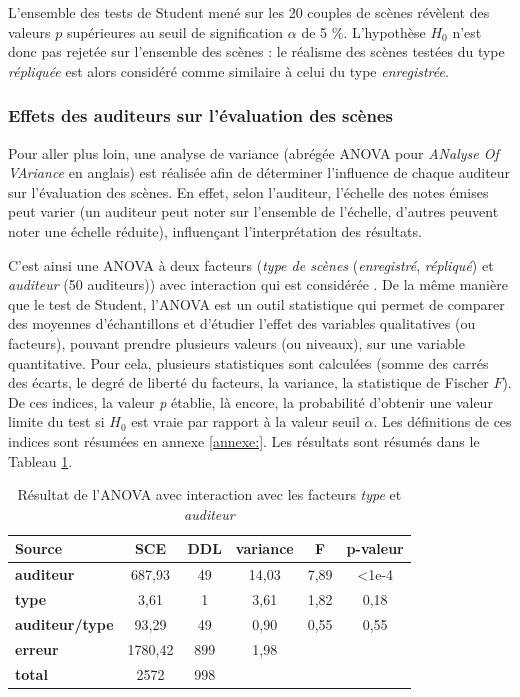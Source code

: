 L'ensemble des tests de Student mené sur les 20 couples de scènes révèlent des valeurs $p$ supérieures au seuil de signification $\alpha$ de 5 $\%$. L'hypothèse $H_0$ n'est donc pas rejetée sur l'ensemble des scènes : le réalisme des scènes testées du type \textit{répliquée} est alors considéré comme similaire à celui du type \textit{enregistrée}.


\subsubsection{Effets des auditeurs sur l'évaluation des scènes}

Pour aller plus loin, une analyse de variance (abrégée ANOVA pour \textit{ANalyse Of VAriance} en anglais) est réalisée afin de déterminer l'influence de chaque auditeur sur l'évaluation des scènes. En effet, selon l'auditeur, l'échelle des notes émises peut varier (un auditeur peut noter sur l'ensemble de l'échelle, d'autres peuvent noter une échelle réduite), influençant l'interprétation des résultats.

C'est ainsi une ANOVA à deux facteurs (\textit{type de scènes} (\textit{enregistré}, \textit{répliqué}) et \textit{auditeur} (50 auditeurs)) avec interaction qui est considérée . De la même manière que le test de Student, l'ANOVA est un outil statistique qui permet de comparer des moyennes d'échantillons et d'étudier l'effet des variables qualitatives (ou facteurs), pouvant prendre plusieurs valeurs (ou niveaux), sur une variable quantitative.
Pour cela, plusieurs statistiques sont calculées (somme des carrés des écarts, le degré de liberté du facteurs, la variance, la statistique de Fischer $F$). De ces indices, la valeur \textit{p} établie, là encore, la probabilité d'obtenir une valeur limite du test si $H_0$ est vraie par rapport à la valeur seuil $\alpha$. Les définitions de ces indices sont résumées en annexe \ref{annexe:}. Les résultats sont résumés dans le Tableau \ref{tab:anova_auditeur}.

\begin{table}[ht]
\centering
\begin{tabular}{lccccc}
\hline
\textbf{Source}     & \textbf{SCE} & \textbf{DDL} & \textbf{variance} & \textbf{F} & \textbf{p-valeur} \\
\hline
\textbf{auditeur} & 687,93 & 49 & 14,03 & 7,89 & <1e-4 \\
\hline
\textbf{type} & 3,61 & 1 & 3,61 & 1,82 & 0,18 \\
\hline
\textbf{auditeur/type} & 93,29 & 49 & 0,90 & 0,55 & 0,55 \\
\hline
\textbf{erreur}      & 1780,42 & 899 & 1,98 & &  \\
\hline
\textbf{total}      & 2572 & 998 & & & \\
\hline
\end{tabular}
\caption{Résultat de l'ANOVA avec interaction avec les facteurs \textit{type} et \textit{auditeur}}
\label{tab:anova_auditeur}
\end{table}

